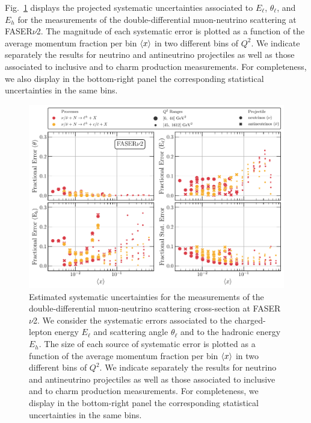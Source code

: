 Fig.~\ref{fig:percentage_uncertainties_overview}
displays the projected systematic uncertainties associated
to $E_\ell$, $\theta_\ell$, and $E_h$ 
for the  measurements of the double-differential
muon-neutrino scattering  at FASER$\nu$2.
%
The magnitude of each systematic error is plotted as a function
of the average momentum fraction per bin $\left\langle x\right\rangle$
in two different bins of $Q^2$.
%
We indicate separately the results for neutrino and antineutrino projectiles as well as
those associated to inclusive and to charm production measurements.
%
For completeness, we also display in the bottom-right panel the corresponding
statistical uncertainties in the same bins.

\begin{figure}[t]
  \centering
  \includegraphics[width=\textwidth]{plots/FASERv2_fractional_error.pdf}
  \caption{\small Estimated systematic uncertainties for the  measurements
    of the double-differential
    muon-neutrino scattering cross-section at FASER$\nu$2.
    We consider the systematic errors
    associated to the charged-lepton energy $E_\ell$ and scattering angle $\theta_\ell$
    and to the hadronic energy $E_h$.
    The size of each source of systematic error is plotted as a function
    of the average momentum fraction per bin $\left\langle x\right\rangle$
    in two different bins of $Q^2$.
    We indicate separately the results for neutrino and antineutrino projectiles as well as
    those associated to inclusive and to charm production measurements.
    For completeness, we display in the bottom-right panel the corresponding
    statistical uncertainties in the same bins.
  }
  \label{fig:percentage_uncertainties_overview}
\end{figure}

